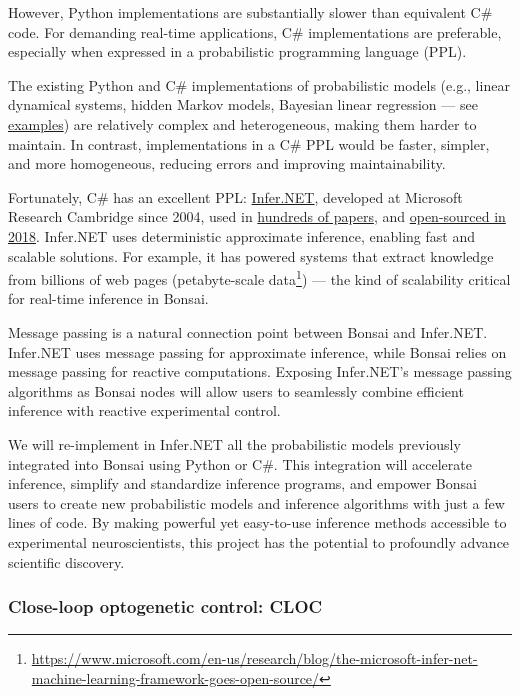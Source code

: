 However, Python implementations are substantially slower than equivalent C\#
code. For demanding real-time applications, C\# implementations are preferable,
especially when expressed in a probabilistic programming language (PPL).

The existing Python and C\# implementations of probabilistic models (e.g.,
linear dynamical systems, hidden Markov models, Bayesian linear regression —
see
\href{https://bonsai-rx.org/machinelearning/examples/README.html}{examples})
are relatively complex and heterogeneous, making them harder to maintain. In
contrast, implementations in a C\# PPL would be faster, simpler, and more
homogeneous, reducing errors and improving maintainability.

Fortunately, C\# has an excellent PPL:
\href{https://dotnet.github.io/infer/}{Infer.NET}, developed at Microsoft
Research Cambridge since 2004, used in
\href{https://dotnet.github.io/infer/papers.html}{hundreds of papers}, and
\href{https://www.microsoft.com/en-us/research/blog/the-microsoft-infer-net-machine-learning-framework-goes-open-source/}{open-sourced
in 2018}.  Infer.NET uses deterministic approximate inference, enabling fast
and scalable solutions. For example, it has powered systems that extract
knowledge from billions of web pages (petabyte-scale
data\footnote[7]{\url{https://www.microsoft.com/en-us/research/blog/the-microsoft-infer-net-machine-learning-framework-goes-open-source/}})
— the kind of scalability critical for real-time inference in Bonsai.

Message passing is a natural connection point between Bonsai and Infer.NET.
Infer.NET uses message passing for approximate inference, while Bonsai relies
on message passing for reactive computations. Exposing Infer.NET’s message
passing algorithms as Bonsai nodes will allow users to seamlessly combine
efficient inference with reactive experimental control.

We will re-implement in Infer.NET all the probabilistic models previously
integrated into Bonsai using Python or C\#. This integration will accelerate
inference, simplify and standardize inference programs, and empower Bonsai
users to create new probabilistic models and inference algorithms with just a
few lines of code. By making powerful yet easy-to-use inference methods
accessible to experimental neuroscientists, this project has the potential to
profoundly advance scientific discovery.

\subsubsection*{Close-loop optogenetic control: CLOC}

